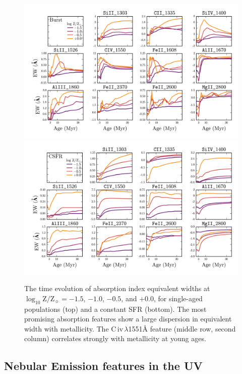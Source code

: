 \documentclass[preprint2,trackchanges]{aastex62}
\newcommand{\logten}{\ensuremath{\log_{10}}}
\newcommand{\logZeq}[1]{\ensuremath{\logten \mathrm{Z}/\mathrm{Z}_{\sun} = #1}}
\newcommand{\ang}{\ensuremath{\mbox{\AA}}\xspace}
\begin{document}
\begin{figure}
  \begin{center}
    \includegraphics[width=0.9\linewidth]{figs/f4a.png}\\
    \includegraphics[width=0.9\linewidth]{figs/f4b.png}
    \caption{The time evolution of absorption index equivalent widths at \logZeq{-1.5}, $-1.0$, $-0.5$, and $+0.0$, for single-aged populations (top) and a constant SFR (bottom). The most promising absorption features show a large dispersion in equivalent width with metallicity. The C{\sc \,iv}$\,\lambda$1551\ang feature (middle row, second column) correlates strongly with metallicity at young ages.}
    \label{fig:EWTimeEvol}
  \end{center}
\end{figure}

\subsection{Nebular Emission features in the UV}\label{sec:mod:em}
\end{document}
